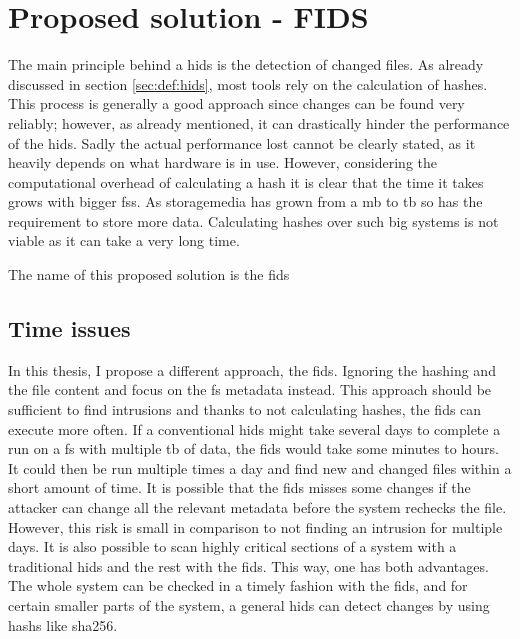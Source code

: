 
\section{Proposed solution - FIDS}
\label{sec:fids}

The main principle behind a \gls{hids} is the detection of changed files. As already discussed in section \ref{sec:def:hids}, most tools rely on the calculation of hashes. This process is generally a good approach since changes can be found very reliably; however, as already mentioned, it can drastically hinder the performance of the \gls{hids}. Sadly the actual performance lost cannot be clearly stated, as it heavily depends on what hardware is in use. However, considering the computational overhead of calculating a \gls{hash} it is clear that the time it takes grows with bigger \glspl{fs}. As \gls{storagemedia} has grown from a \gls{mb} to \gls{tb} so has the requirement to store more data. Calculating hashes over such big systems is not viable as it can take a very long time. \cite{hash:slow, hash:veryslow, hash:speed}

The name of this proposed solution is the \gls{fids}

\subsection{Time issues}

In this thesis, I propose a different approach, the \gls{fids}. Ignoring the hashing and the file content and focus on the \gls{fs} \gls{metadata} instead. This approach should be sufficient to find intrusions and thanks to not calculating hashes, the \gls{fids} can execute more often. If a conventional \gls{hids} might take several days to complete a run on a \gls{fs} with multiple \gls{tb} of data, the \gls{fids} would take some minutes to hours. It could then be run multiple times a day and find new and changed files within a short amount of time. It is possible that the \gls{fids} misses some changes if the attacker can change all the relevant \gls{metadata} before the system rechecks the file. However, this risk is small in comparison to not finding an intrusion for multiple days. It is also possible to scan highly critical sections of a system with a traditional \gls{hids} and the rest with the \gls{fids}. This way, one has both advantages. The whole system can be checked in a timely fashion with the \gls{fids}, and for certain smaller parts of the system, a general \gls{hids} can detect changes by using \glspl{hash} like \gls{sha256}.

